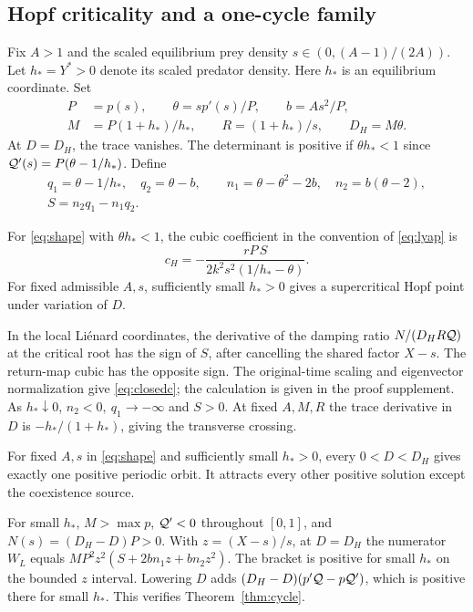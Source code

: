 \subsection{Hopf criticality and a one-cycle family}\label{sec:family}
Fix \(A>1\) and the scaled equilibrium prey density \(s\in(0,(A-1)/(2A))\). Let \(h_*=Y^*>0\) denote its scaled predator density. Here \(h_*\) is an equilibrium coordinate. Set
\begin{equation}\label{eq:shape}
 \begin{aligned}
 P&=p(s),\qquad \theta=sp'(s)/P,\qquad b=As^2/P,\\
 M&=P(1+h_*)/h_*,\qquad R=(1+h_*)/s,\qquad D_H=M\theta.
 \end{aligned}
\end{equation}
At \(D=D_H\), the trace vanishes. The determinant is positive if \(\theta h_*<1\) since \(\mathcal Q'(s)=P(\theta-1/h_*)\). Define
\begin{equation}\label{eq:fcoeff}
 \begin{gathered}
 q_1=\theta-1/h_*,\quad q_2=\theta-b,\qquad
 n_1=\theta-\theta^2-2b,\quad n_2=b(\theta-2),\\
 S=n_2q_1-n_1q_2 .
 \end{gathered}
\end{equation}
\begin{theorem}\label{thm:focal}
For \eqref{eq:shape} with \(\theta h_*<1\), the cubic coefficient in the convention of \eqref{eq:lyap} is
\begin{equation}\label{eq:closedc}
 c_H=-\frac{rP\,S}{2k^2s^2(1/h_*-\theta)} .
\end{equation}
For fixed admissible \(A,s\), sufficiently small \(h_*>0\) gives a supercritical Hopf point under variation of \(D\).
\end{theorem}
In the local Li\'enard coordinates, the derivative of the damping ratio \(N/(D_HR\mathcal Q)\) at the critical root has the sign of \(S\), after cancelling the shared factor \(X-s\). The return-map cubic has the opposite sign. The original-time scaling and eigenvector normalization give \eqref{eq:closedc}; the calculation is given in the proof supplement. As \(h_*\downarrow0\), \(n_2<0,\ q_1\to-\infty\) and \(S>0\). At fixed \(A,M,R\) the trace derivative in \(D\) is \(-h_* /(1+h_*)\), giving the transverse crossing.

\begin{corollary}\label{cor:unique}
For fixed \(A,s\) in \eqref{eq:shape} and sufficiently small \(h_*>0\), every \(0<D<D_H\) gives exactly one positive periodic orbit. It attracts every other positive solution except the coexistence source.
\end{corollary}
For small \(h_*\), \(M>\max p\), \(\mathcal Q'<0\) throughout \([0,1]\), and \(N(s)=(D_H-D)P>0\). With \(z=(X-s)/s\), at \(D=D_H\) the numerator \(W_L\) equals
\(MP^2z^2(S+2bn_1z+bn_2z^2)\). The bracket is positive for small \(h_*\) on the bounded \(z\) interval. Lowering \(D\) adds \((D_H-D)(p'\mathcal Q-p\mathcal Q')\), which is positive there for small \(h_*\). This verifies Theorem~\ref{thm:cycle}.

